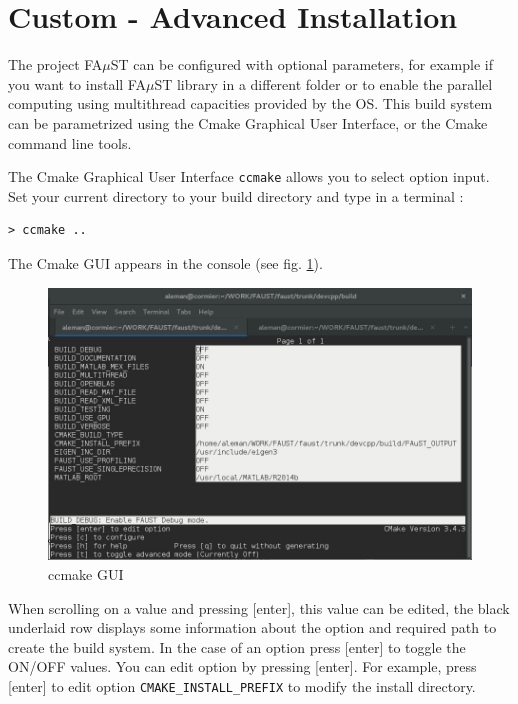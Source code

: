 \section{Custom - Advanced Installation}\label{sec:UnixCustomInstall}

The project FA$\mu$ST can be configured with optional parameters, for example if you want to install FA$\mu$ST library in a different folder or to enable the parallel computing using multithread capacities provided by the OS. This build system can be parametrized using the Cmake Graphical User Interface, or the Cmake command line tools. 

The Cmake Graphical User Interface \texttt{ccmake} allows you to select option input. Set your current directory to your build directory and type in a terminal :
\lstset{style=customBash}
\begin{lstlisting}
> ccmake ..
\end{lstlisting}

The Cmake GUI appears in the console (see fig. \ref{fig:ccmake}). 

\begin{figure}[H] %
\centering
\includegraphics[scale=0.5]{images/ccmake.jpg}
\caption{ccmake GUI}
\label{fig:ccmake}
\end{figure}

When scrolling on a value and pressing [enter], this value can be edited, the black underlaid row displays some information about the option and required path to create the build system. In the case of an option press [enter] to toggle the ON/OFF values. You can edit option by pressing [enter]. For example, press [enter] to edit option \texttt{CMAKE\_INSTALL\_PREFIX} to modify the install directory. 

